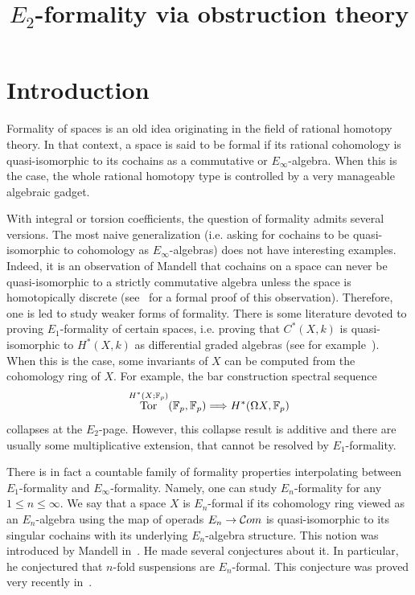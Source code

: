 \documentclass[AHL,Unicode,longabstracts,published]{cedram}
\title[$E_2$-formality via obstruction theory]{$E_2$-formality via obstruction theory}
\author[\initial{G.} \lastname{Horel}]{\firstname{Geoffroy} \lastname{Horel}}
\DeclareMathOperator{\rTor}{Tor}
\newcommand{\FF}{\mathbb{F}}
\newcommand{\clC}{\mathcal{C}}
\renewcommand*{\to}{\mathchoice{\longrightarrow}{\rightarrow}{\rightarrow}{\rightarrow}}
\newcommand*{\RightArrow}{\mathchoice{\Longrightarrow}{\Rightarrow}{\Rightarrow}{\Rightarrow}}
\let\originalleft\left
\let\originalright\right
\renewcommand{\left}{\mathopen{}\mathclose\bgroup\originalleft}
\renewcommand{\right}{\aftergroup\egroup\originalright}
\newcommand{\FF}{\mathbb{F}}
\begin{document}
\maketitle


\section{Introduction}

Formality of spaces is an old idea originating in the field of rational homotopy theory. In that context, a space is said to be formal if its rational cohomology is quasi-isomorphic to its cochains as a commutative or $E_\infty$-algebra. When this is the case, the whole rational homotopy type is controlled by a very manageable algebraic gadget.

With integral or torsion coefficients, the question of formality admits several versions. The most naive generalization (i.e. asking for cochains to be quasi-isomorphic to cohomology as $E_\infty$-algebras) does not have interesting examples. Indeed, it is an observation of Mandell that cochains on a space can never be quasi-isomorphic to a strictly commutative algebra unless the space is homotopically discrete (see~\cite[Proposition~5.1]{flynnobstruction} for a formal proof of this observation). Therefore, one is led to study weaker forms of formality. There is some literature devoted to proving $E_1$-formality of certain spaces, i.e. proving that $C^*(X,k)$ is quasi-isomorphic to $H^*(X,k)$ as differential graded algebras (see for example~\cite{berglundkoszul,
ciricietale,drummondhorel,
elhaouari,salvatoreformality}). When this is the case, some invariants of $X$ can be computed from the cohomology ring of $X$. For example, the bar construction spectral sequence
\[
\rTor^{H^*(X;\FF_p)}\left(\FF_p,\FF_p\right)\RightArrow H^*\left(\Omega X,\FF_p\right)
\]
collapses at the $E_2$-page. However, this collapse result is additive and there are usually some multiplicative extension, that cannot be resolved by $E_1$-formality.

There is in fact a countable family of formality properties interpolating between $E_1$-formality and $E_\infty$-formality. Namely, one can study $E_n$-formality for any $1\leq n\leq \infty$. We say that a space $X$ is $E_n$-formal if its cohomology ring viewed as an $E_n$-algebra using the map of operads $E_n\to\clC om$ is quasi-isomorphic to its singular cochains with its underlying $E_n$-algebra structure. This notion was introduced by Mandell in~\cite{mandellformality}. He made several conjectures about it. In particular, he conjectured that $n$-fold suspensions are $E_n$-formal. This conjecture was proved very recently in~\cite{heutsland}.
\end{document}
